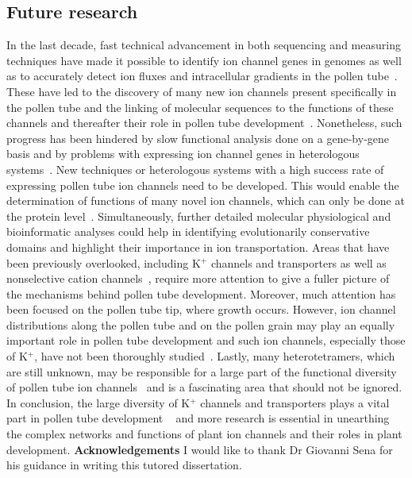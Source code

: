 \documentclass[11pt]{article}
\begin{document}
\begin{multicols*}{2}
\subsection{Future research}
In the last decade, fast technical advancement in both sequencing and measuring techniques have made it possible to identify ion channel genes in genomes as well as to accurately detect ion fluxes and intracellular gradients in the pollen tube~\citep{Holdaway-Clarke2003,Kircher2010}. These have led to the discovery of many new ion channels present specifically in the pollen tube and the linking of molecular sequences to the functions of these channels and thereafter their role in pollen tube development~\citep{Arabidopsis2000,Bock2006}. Nonetheless, such progress has been hindered by slow functional analysis done on a gene-by-gene basis and by problems with expressing ion channel genes in heterologous systems~\citep{Becker2007,Lebaudy2007a,Marcel2010}.   
\newline\newline
New techniques or heterologous systems with a high success rate of expressing pollen tube ion channels need to be developed. This would enable the determination of functions of many novel ion channels, which can only be done at the protein level~\citep{Becker2007}. Simultaneously, further detailed molecular physiological and bioinformatic analyses could help in identifying evolutionarily conservative domains and highlight their importance in ion transportation. 
\newline\newline
Areas that have been previously overlooked, including K$^{+}$ channels and transporters as well as nonselective cation channels~\citep{Holdaway-Clarke2003}, require more attention to give a fuller picture of the mechanisms behind pollen tube development. Moreover, much attention has been focused on the pollen tube tip, where growth occurs. However, ion channel distributions along the pollen tube and on the pollen grain may play an equally important role in pollen tube development and such ion channels, especially those of K$^{+}$, have not been thoroughly studied~\citep{Dutta2004}. Lastly, many heterotetramers, which are still unknown, may be responsible for a large part of the functional diversity of pollen tube ion channels~\citep{Rocchetti2012} and is a fascinating area that should not be ignored. 
\newline\newline
In conclusion, the large diversity of K$^{+}$ channels and transporters plays a vital part in pollen tube development ~\citep{Hedrich2012} and more research is essential in unearthing the complex networks and functions of plant ion channels and their roles in plant development. 
\newline\newline\newline
\textbf{\Large{Acknowledgements}}
\newline\newline
I would like to thank Dr Giovanni Sena for his guidance in writing this tutored dissertation. 




\end{multicols*}
\end{document}
